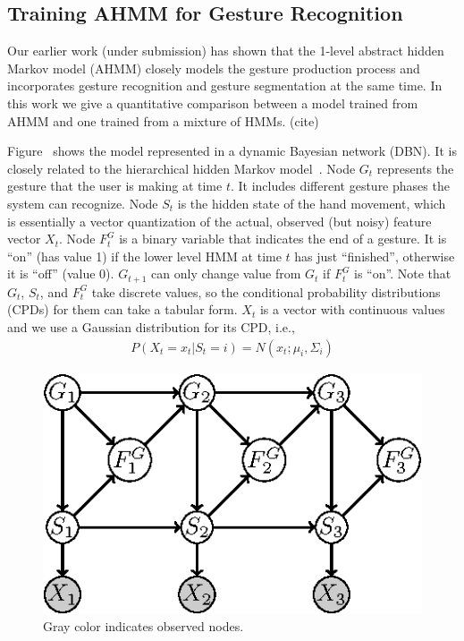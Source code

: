\documentclass{sigchi}
\begin{document}
\subsection{Training AHMM for Gesture Recognition}
Our earlier work (under submission) has shown that the 1-level abstract hidden
Markov model (AHMM) closely models the gesture production process and
incorporates gesture recognition and gesture segmentation at the same time. In
this work we give a quantitative comparison between a model trained from AHMM
and one trained from a mixture of HMMs. (cite)

Figure~\cite{fig:ahmm} shows the model represented in a dynamic Bayesian network
(DBN). It is closely related to the hierarchical hidden Markov
model~\cite{murphy02}. Node $G_t$ represents the gesture that the
user is making at time $t$. It includes different gesture phases the system
can recognize.
Node $S_t$ is the hidden state of the hand movement, which is essentially a
vector quantization of the actual, observed (but noisy) feature vector $X_t$. 
Node $F_t^G$ is a binary variable that indicates the end of a
gesture. It is ``on'' (has value 1) if the lower level HMM at time $t$ has just
``finished'', otherwise it is ``off'' (value 0). $G_{t+1}$ can only change value
from $G_t$ if $F_t^G$ is ``on''. Note that $G_t$, $S_t$, and $F_t^G$ take
discrete values, so the conditional probability distributions (CPDs) for them
can take a tabular form. $X_t$ is a vector with continuous values and we use a
Gaussian distribution for its CPD, i.e.,
\begin{align}
P(X_t = x_t | S_t = i) = N(x_t; \mu_i, \Sigma_i)
\end{align}

\begin{figure}
\centering
\includegraphics[]{figure/ahmm.eps}
\caption{Gray color indicates observed nodes.}
\label{fig:ahmm}
\end{figure}
\end{document}
